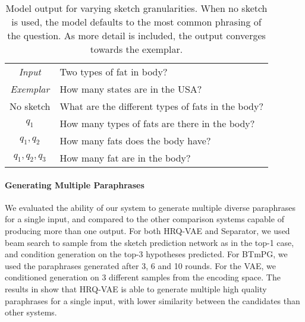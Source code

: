 \documentclass[11pt]{article}
\begin{document}
\begin{table}[t]
\small
    \centering
    \begin{tabular}{@{~}c@{~}|@{~}p{5.9cm}@{}}
    
\hline \hline
    \textit{Input} & Two types of fat in body? \\
    \textit{Exemplar} & How many states are in the USA? \\
    \hline
    No sketch & What are the different types of fats in the body?  \\
    $q_1$ & How many types of fats are there in the body? \\
    $q_1,q_2$ & How many fats does the body have? \\
    $q_1,q_2,q_3$ & How many fat are in the body? \\
    \hline
    \hline
    \end{tabular}
\caption{Model output for varying sketch granularities. When no sketch is used, the model defaults to the most common phrasing of the question. As more detail is included, the output converges towards the exemplar.}
\label{tab:maskedexample}
\end{table}


\paragraph{Generating Multiple Paraphrases} We evaluated the ability of our system to generate multiple diverse paraphrases for a single input, and compared to the other comparison systems capable of producing more than one output. For both HRQ-VAE and Separator, we used beam search to sample from the sketch prediction network as in the top-1 case, and condition generation on the top-3 hypotheses predicted. For BTmPG, we used the paraphrases generated after 3, 6 and 10 rounds. For the VAE, we conditioned generation on 3 different samples from the encoding space. The results in  show that HRQ-VAE is able to generate multiple high quality paraphrases for a single input, with lower similarity between the candidates than other systems.
\end{document}
